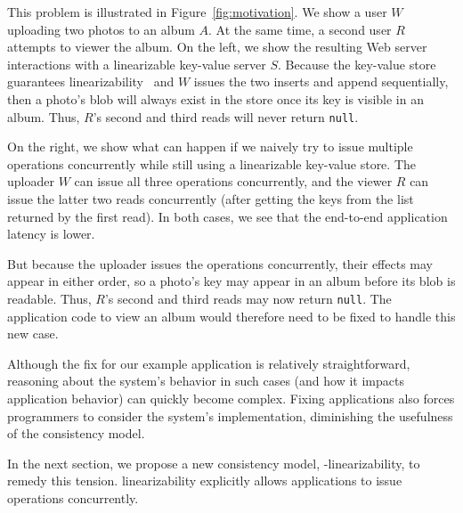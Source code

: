 This problem is illustrated in Figure~\ref{fig:motivation}. We
show a user $W$ uploading two photos to an album $A$. At the same time, a
second user $R$ attempts to viewer the album. On the left, we show the
resulting Web server interactions with a linearizable key-value server $S$.
Because the key-value store guarantees
linearizability~\cite{herlihy1990linearizability} and $W$ issues the
two inserts and append sequentially, then a photo's blob will
always exist in the store once its key is visible in an album.
Thus, $R$'s second and third reads will never return \texttt{null}.

On the right, we show what can happen if we naively try to issue multiple
operations concurrently while still using a linearizable key-value store.
The uploader $W$ can issue all three operations concurrently, and the
viewer $R$ can issue the latter two reads concurrently (after getting the keys
from the list returned by the first read). In both cases, we see that the
end-to-end application latency is lower.

But because the uploader issues the operations concurrently,
their effects may appear in either order, so a photo's key may appear in an 
album before its blob is readable. Thus, $R$'s second and third reads may now
return \texttt{null}. The application code to view an album would therefore
need to be fixed to handle this new case.

Although the fix for our example application is relatively straightforward,
reasoning about the system's behavior in such cases (and how it impacts application behavior)
can quickly become complex.
Fixing applications also forces programmers to consider the system's implementation,
diminishing the usefulness of the consistency model.

In the next section, we propose a new \multidispatch{} 
consistency model, \md{}-linearizability, to remedy this 
tension. \Multidispatch{} linearizability explicitly allows 
applications to issue operations concurrently.

